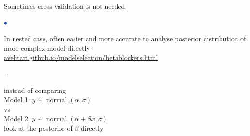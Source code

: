 \documentclass[english,t]{beamer}
\DeclareMathOperator{\normal}{normal}
\newenvironment{list1}{
   \begin{list}{$\color{list1}\bullet$}{\itemsep=6pt}}{
  \end{list}}
\newenvironment{list2}{
  \begin{list}{-}{\baselineskip=12pt\itemsep=2pt}}{
  \end{list}}
\begin{document}

\begin{frame}{Sometimes cross-validation is not needed}

\begin{list1}
\item<+-> In nested case, often easier and
  more accurate to analyse posterior distribution of more complex
  model directly \\
  {\small \url{avehtari.github.io/modelselection/betablockers.html}}
  \begin{list2}
  \item instead of comparing\\
    \vspace{0.2\baselineskip}
    Model 1: $y \sim \normal(\alpha, \sigma)$\\
    \vspace{0.2\baselineskip}
    vs\\
    \vspace{0.2\baselineskip}
    Model 2: $y \sim \normal(\alpha + \beta x, \sigma)$\\
    \vspace{0.2\baselineskip}
    look at the posterior of $\beta$ directly
  \end{list2}
\end{list1}

\end{frame}
\end{document}

